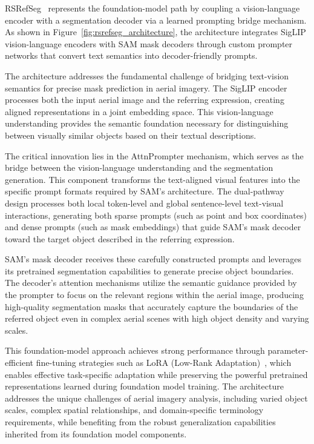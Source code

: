 RSRefSeg~\cite{chen2025rsrefseg} represents the foundation-model path by coupling a vision-language encoder with a segmentation decoder via a learned prompting bridge mechanism. As shown in Figure~\ref{fig:rsrefseg_architecture}, the architecture integrates SigLIP vision-language encoders with SAM mask decoders through custom prompter networks that convert text semantics into decoder-friendly prompts.

The architecture addresses the fundamental challenge of bridging text-vision semantics for precise mask prediction in aerial imagery. The SigLIP encoder processes both the input aerial image and the referring expression, creating aligned representations in a joint embedding space. This vision-language understanding provides the semantic foundation necessary for distinguishing between visually similar objects based on their textual descriptions.

The critical innovation lies in the AttnPrompter mechanism, which serves as the bridge between the vision-language understanding and the segmentation generation. This component transforms the text-aligned visual features into the specific prompt formats required by SAM's architecture. The dual-pathway design processes both local token-level and global sentence-level text-visual interactions, generating both sparse prompts (such as point and box coordinates) and dense prompts (such as mask embeddings) that guide SAM's mask decoder toward the target object described in the referring expression.

SAM's mask decoder receives these carefully constructed prompts and leverages its pretrained segmentation capabilities to generate precise object boundaries. The decoder's attention mechanisms utilize the semantic guidance provided by the prompter to focus on the relevant regions within the aerial image, producing high-quality segmentation masks that accurately capture the boundaries of the referred object even in complex aerial scenes with high object density and varying scales.

This foundation-model approach achieves strong performance through parameter-efficient fine-tuning strategies such as LoRA (Low-Rank Adaptation)~\cite{lora}, which enables effective task-specific adaptation while preserving the powerful pretrained representations learned during foundation model training. The architecture addresses the unique challenges of aerial imagery analysis, including varied object scales, complex spatial relationships, and domain-specific terminology requirements, while benefiting from the robust generalization capabilities inherited from its foundation model components.

